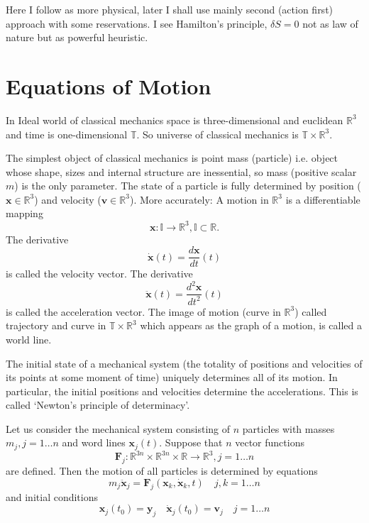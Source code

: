 Here I follow \cite{Arnold1989} as more physical, later
I shall use mainly second (action first) approach with some reservations.
I see Hamilton's principle, $\delta S=0$ not as law of nature but as 
powerful heuristic.

\section{Equations of Motion}
\label{sec:cm-eom}
In Ideal world of classical mechanics space is three-dimensional  and euclidean
$\mathbb{R}^3$ and time is one-dimensional $\mathbb{T}$.
So universe of classical mechanics is $\mathbb{T} \times \mathbb{R}^3$. 

The simplest object of classical mechanics is point mass (particle) i.e. object
whose shape, sizes and internal structure are inessential, so mass (positive
scalar $m$) is the only parameter. 
The state of a particle is fully determined by position ($\bm x \in\mathbb{R}^3$) 
and velocity ($\bm v \in\mathbb{R}^3$). 
More accurately: A motion in $\mathbb{R}^3$ is a differentiable mapping 
\[\bm x: \mathbb{I}\rightarrow \mathbb{R}^3, \mathbb{I} \subset \mathbb{R}.\] 
The derivative 
\[\dot {\bm x}(t)=\frac{d{\bm x}}{dt}(t)\]
is called the velocity vector. 
The derivative 
\[\ddot {\bm x}(t)=\frac{ d^2 {\bm x}}{dt^2}(t)\]
is called the acceleration vector. 
The image of motion (curve in $\mathbb{R}^3$) called trajectory and  curve in 
$\mathbb{T} \times \mathbb{R}^3$ which appears  as the graph of a motion, is
called a world line.

The initial state of a mechanical system (the totality of positions and
velocities of its points at some moment of time) uniquely determines all of
its motion. In particular, the initial positions and velocities determine the
accelerations. This is called `Newton's principle of determinacy'.

Let us consider the mechanical system consisting of $n$ particles 
with masses $m_j,j=1\ldots n$ and word lines $\bm x_j(t)$.
Suppose that $n$ vector functions   
\[{\bm F}_j:\mathbb{R}^{3 n}\times\mathbb{R}^{3 n}
\times\mathbb{R}\rightarrow\mathbb{R}^3,j=1\ldots n\]
are defined. Then the motion of all particles is determined by equations
\begin{equation}
  \label {newton-eq}
    m_j \ddot {\bm x}_j={\bm F}_j({\bm x}_k,\dot {\bm x}_k,t) \quad j,k=1\ldots n 
\end{equation}
and initial conditions
\begin{equation}
\label {newton-ic}
    {\bm x}_j(t_0)={\bm y}_j\quad\dot {\bm x}_j(t_0)={\bm v}_j  \quad j=1\ldots n 
\end{equation}

